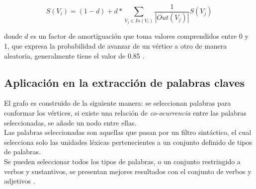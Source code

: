 \begin{equation}
	S(V_i) = (1 - d) + d * \sum_{V_j\in In(V_i)}{\frac{1}{|Out(V_j)|}S(V_j)}
\end{equation}

donde $d$ es un factor de amortiguaci\'on que toma valores comprendidos entre
0 y 1, que expresa la probabilidad de avanzar de un v\'ertice a otro de manera
aleatoria, generalmente tiene el valor de 0.85 \cite{SBLP98}.

\subsection{Aplicaci\'on en la extracci\'on de palabras claves}
El grafo es construido de la siguiente manera: se seleccionan palabras  para 
conformar los v\'ertices, si existe una relaci\'on de \emph{co-ocurrencia} entre 
las palabras seleccionadas, se a\~nade un nodo entre ellas. \\

Las palabras seleccionadas son aquellas que pasan por un filtro sint\'actico, el cual
selecciona solo las unidades l\'exicas pertenecientes a un conjunto definido de tipos
de palabras. \\

Se pueden seleccionar todos los tipos de palabras, o un conjunto restringido a verbos
y sustantivos, se presentan mejores resultados con el conjunto de verbos y
adjetivos \cite{RMPT04} .
